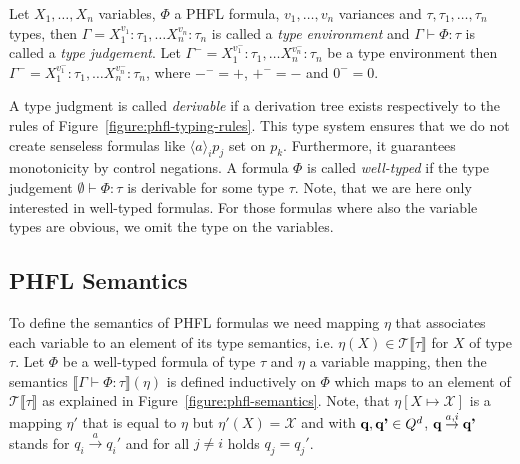 \begin{definition}
    Let $X_1, \dots, X_n$ variables, $\Phi$ a PHFL formula, $v_1, \dots, v_n$ variances and $\tau, \tau_1, \dots,
    \tau_n$ types, then $\Gamma = X_1^{v_1}\colon \tau_1, \dots X_n^{v_n} \colon \tau_n$ is
    called a \emph{type environment} and $\Gamma \vdash \Phi\colon\tau$
    is called a \emph{type judgement}. Let $\Gamma^- = X_1^{v_1^-}\colon \tau_1, \dots
    X_n^{v_n^-} \colon \tau_n$ be a type environment then $\Gamma^- = X_1^{v_1^-}\colon \tau_1, \dots
    X_n^{v_n^-} \colon \tau_n$, where $-^- = +$, $+^- = -$ and $0^- = 0$.
\end{definition}

A type judgment is called \textit{derivable} if a derivation tree exists respectively to the rules of
Figure~\ref{figure:phfl-typing-rules}. This type system ensures that we do not create senseless formulas like
$\langle a \rangle_i p_j$ set on $p_k$. Furthermore, it guarantees monotonicity by control negations. A formula
$\Phi$ is called \textit{well-typed} if the type judgement $\emptyset \vdash \Phi:\tau$ is derivable for some type
$\tau$. Note, that we are here only interested in well-typed formulas. For those formulas where also the variable
types are obvious, we omit the type on the variables.

\subsection{PHFL Semantics}\label{subsec:phflSemantics}

To define the semantics of PHFL formulas we need mapping $\eta$ that associates each variable to an element of its
type semantics, i.e. $\eta(X) \in \mathcal{T}\llbracket\tau\rrbracket$ for $X$ of type $\tau$. Let $\Phi$ be a
well-typed formula of type $\tau$ and $\eta$ a variable mapping, then the semantics $\llbracket\Gamma \vdash \Phi
\colon \tau \rrbracket(\eta)$ is defined inductively on $\Phi$ which maps to an element of
$\mathcal{T}\llbracket\tau\rrbracket$ as explained in Figure~\ref{figure:phfl-semantics}.
Note, that $\eta[X \mapsto \mathcal{X}]$ is a mapping $\eta'$ that is equal to $\eta$ but $\eta'(X) = \mathcal{X}$ and
with $\emph{q}, \emph{q'} \in Q^d$, $\emph{q} \overset{a, i}{\rightarrow} \emph{q'}$ stands for $q_i
\overset{a}{\rightarrow} {q_i}'$ and for all $j \neq i$ holds $q_j = {q_j}'$.

